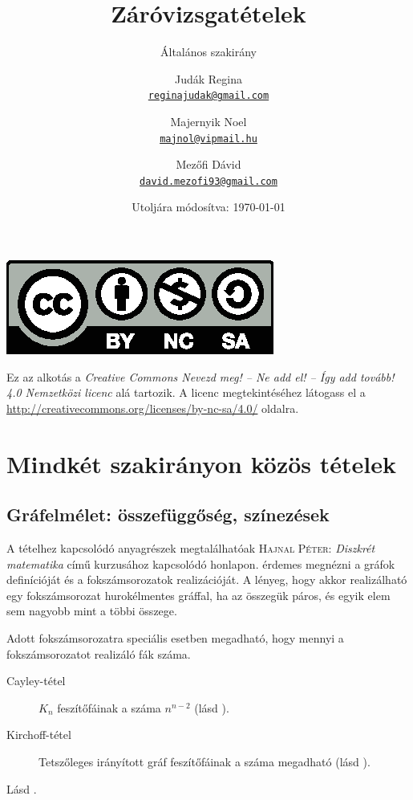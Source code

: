 \documentclass[%
	DIV=15,appendixprefix]{scrreprt}
\title{Záróvizsgatételek}
\subtitle{Általános szakirány}
\author{Judák Regina\\\href{mailto:reginajudak@gmail.com}{\nolinkurl{reginajudak@gmail.com}}%
	\and%
	Majernyik Noel\\\href{mailto:majnol@vipmail.hu}{\nolinkurl{majnol@vipmail.hu}}%
	\and%
	Mezőfi Dávid\\\href{mailto:david.mezofi93@gmail.com}{\nolinkurl{david.mezofi93@gmail.com}}}
\date{Utoljára módosítva: \today}
\theoremstyle{definition}
\theoremstyle{remark}
\begin{document}
%
\maketitle
%
\begin{center}
	\includegraphics{by-nc-sa.eps}
\end{center}
Ez az alkotás a \emph{Creative Commons Nevezd meg! -- Ne add el! -- Így add tovább! 4.0 Nemzetközi
licenc} alá tartozik. A licenc megtekintéséhez látogass el a
\url{http://creativecommons.org/licenses/by-nc-sa/4.0/} oldalra.
%
\tableofcontents
%
%
%
\chapter{Mindkét szakirányon közös tételek}
%
\section{Gráfelmélet: összefüggőség, színezések}
A tételhez kapcsolódó anyagrészek megtalálhatóak \textsc{Hajnal Péter}: \emph{Diszkrét matematika}
\cite{DiMat} című kurzusához kapcsolódó honlapon.
%
 érdemes megnézni a gráfok definícióját és a
fokszámsorozatok realizációját. A lényeg, hogy akkor realizálható egy fokszámsorozat hurokélmentes
gráffal, ha az összegük páros, és egyik elem sem nagyobb mint a többi összege.

Adott fokszámsorozatra speciális esetben megadható, hogy mennyi a fokszámsorozatot realizáló fák
száma.
\begin{description}
	\item[Cayley-tétel] $ K_n $ feszítőfáinak a száma $n^{n-2}$ (lásd
		\cite[\href{http://www.math.u-szeged.hu/~hajnal/courses/MSc_Diszkret/MSc_kombi13/ea-fak.pdf}
		{\emph{Fák összeszámlálása I. -- Cayley tétele}}]{DiMat}).
	\item[Kirchoff-tétel] Tetszőleges irányított gráf feszítőfáinak a száma megadható (lásd
	\cite[\href{http://www.math.u-szeged.hu/~hajnal/courses/MSc_Diszkret/MSc_kombi13/ea-fak.pdf}{%
		\emph{Fák összeszámlálása II. -- Kirchoff tétele}}, 6.~oldal]{DiMat}).
\end{description}
%
Lásd
\cite[\href{http://www.math.u-szeged.hu/~hajnal/courses/MSc_Diszkret/MSc_kombi13/ea-Vizing.pdf}{%
\emph{Gráfok élszínezései}}]{DiMat}.
\end{document}
